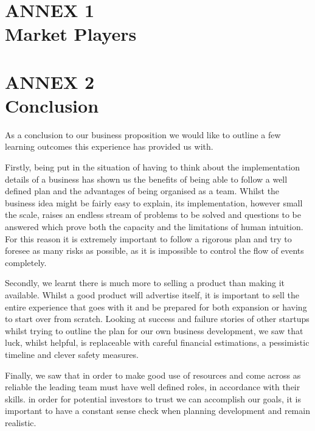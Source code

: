 \documentclass[11pt]{article}
\begin{document}
\newpage

\section{ANNEX 1 \\ Market Players}

\newpage


\section{ANNEX 2 \\ Conclusion}
As a conclusion to our business proposition we would like to outline a few 
learning outcomes this experience has provided us with.

Firstly, being put in the situation of having to think about the implementation 
details of a business has shown us the benefits of being able to follow a well 
defined plan and the advantages of being organised as a team. Whilst the 
business idea might be fairly easy to explain, its implementation, however small
the scale, raises an endless stream of problems to be solved and questions to 
be answered which prove both the capacity and the limitations of human 
intuition. For this reason it is extremely important to follow a rigorous plan 
and try to foresee as many risks as possible, as it is impossible to control the
flow of events completely.

Secondly, we learnt there is much more to selling a product than making it 
available. Whilst a good product will advertise itself, it is important to sell 
the entire experience that goes with it and be prepared for both expansion or
having to start over from scratch. Looking at success and failure stories of 
other startups whilst trying to outline the plan for our own business 
development, we saw that luck, whilst helpful, is replaceable with careful 
financial estimations, a pessimistic timeline and clever safety measures.

Finally, we saw that in order to make good use of resources and come across as 
reliable the leading team must have well defined roles, in accordance with their
skills. in order for potential investors to trust we can accomplish our goals, 
it is important to have a constant sense check when planning development and 
remain realistic.
\end{document}
